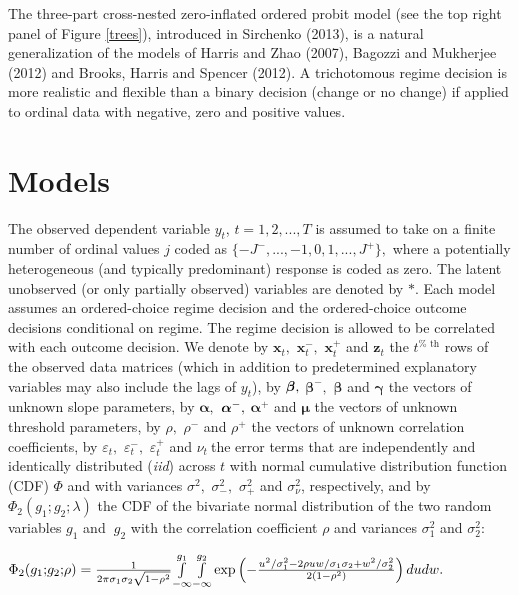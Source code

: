 \documentclass[letterpaper,fleqn,12pt]{article}
\begin{document}
\begin{onehalfspace}
The three-part cross-nested zero-inflated ordered probit model (see the top
right panel of Figure \ref{trees}), introduced in Sirchenko (2013), is a
natural generalization of the models of Harris and Zhao (2007), Bagozzi and
Mukherjee (2012) and Brooks, Harris and Spencer (2012). A trichotomous
regime decision is more realistic and flexible than a binary decision
(change or no change) if applied to ordinal data with negative, zero and
positive values.

\section{\noindent Models}

The observed dependent variable $y_{t}$, $t=1,2,...,T$ is assumed to take on
a finite number of ordinal values $j$ coded as $%
\{-J^{-},...,-1,0,1,...,J^{+}\},$ where a potentially heterogeneous (and
typically predominant) response is coded as zero. The latent unobserved (or
only partially observed) variables are denoted by $\ast $. Each model
assumes an ordered-choice regime decision and the ordered-choice outcome
decisions conditional on regime. The regime decision is allowed to be
correlated with each outcome decision. We denote by $\mathbf{x}_{t},$ $%
\mathbf{x}_{t}^{-},$ $\mathbf{x}_{t}^{+}$ and $\mathbf{z}_{t}$ the $t^{\text{%
th}}$ rows of the observed data matrices (which in addition to predetermined
explanatory variables may also include the lags of $y_{t}$), by $\mathbf{%
\beta ,}$ $\mathbf{\beta }^{-},$ $\mathbf{\beta }$ and $\mathbf{\gamma }$
the vectors of unknown slope parameters, by $\mathbf{\alpha ,}$ $\mathbf{%
\alpha }^{-}\mathbf{,}$ $\mathbf{\alpha }^{+}$ and $\mathbf{\mu }$ the
vectors of unknown threshold parameters, by $\rho ,$ $\rho ^{-}$ and $\rho
^{+}$ the vectors of unknown correlation coefficients, by $\varepsilon _{t},$
$\varepsilon _{t}^{-},$ $\varepsilon _{t}^{+}$ and $\nu _{t}\ $the error
terms that are independently and identically distributed (\textit{iid})
across $t$ with normal cumulative distribution function (CDF) $\Phi $ and
with variances $\sigma ^{2},$ $\sigma _{-}^{2},$ $\sigma _{+}^{2}$ and $%
\sigma _{\nu }^{2}$, respectively, and by $\Phi _{2}(g_{1}\mathbf{;}g_{2}%
\mathbf{;}\lambda )$ the CDF of the bivariate normal distribution of the two
random variables $g_{1}$ and\textbf{\ }$g_{2}$ with the correlation
coefficient $\rho $ and variances $\sigma _{1}^{2}$ and $\sigma _{2}^{2}$:

\begin{center}
$\Phi _{2}(g_{1}\mathbf{;}g_{2}\mathbf{;}\rho )=\frac{1}{2\pi \sigma
_{1}\sigma _{2}\sqrt{1-\rho ^{2}}}\underset{}{\underset{-\infty }{\overset{%
g_{1}}{\int }}}\underset{-\infty }{\overset{g_{2}}{\int }}\exp \left( -\frac{%
u^{2}/\sigma _{1}^{2}-2\rho uw/\sigma _{1}\sigma _{2}+w^{2}/\sigma _{2}^{2}}{%
2(1-\rho ^{2})}\right) dudw.$
\end{center}

\end{onehalfspace}%
\end{document}
